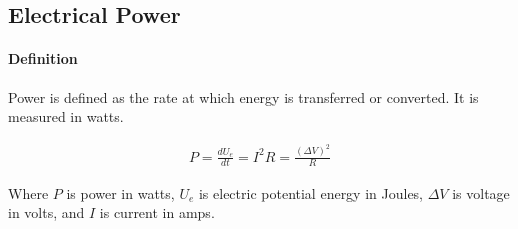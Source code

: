 \subsection{Electrical Power}


\paragraph*{Definition}
Power is defined as the rate at which energy is transferred or converted. It is measured in watts.

\begin{align*}
    P = \frac{dU_e}{dt} = I^2R = \frac{(\Delta V)^2}{R}
\end{align*}

Where $P$ is power in watts, $U_e$ is electric potential energy in Joules, $\Delta V$ is voltage in volts, and $I$ is current in amps.